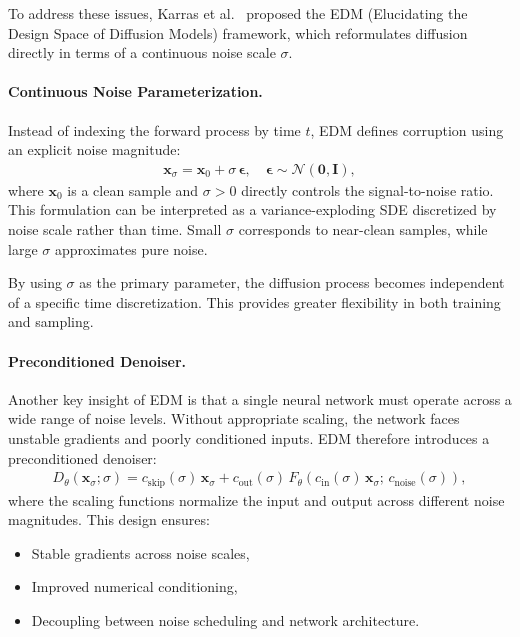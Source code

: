 To address these issues, Karras et al.~\cite{karras2022elucidating} proposed the EDM (Elucidating the Design Space of Diffusion Models) framework, which reformulates diffusion directly in terms of a continuous noise scale $\sigma$.

\paragraph{Continuous Noise Parameterization.}
Instead of indexing the forward process by time $t$, EDM defines corruption using an explicit noise magnitude:
\begin{align}
    \mathbf{x}_\sigma = \mathbf{x}_0 + \sigma\,\boldsymbol{\epsilon}, \quad \boldsymbol{\epsilon} \sim \mathcal{N}(\mathbf{0}, \mathbf{I}),
    \label{eq:edm_noise}
\end{align}
where $\mathbf{x}_0$ is a clean sample and $\sigma > 0$ directly controls the signal-to-noise ratio. This formulation can be interpreted as a variance-exploding SDE discretized by noise scale rather than time. Small $\sigma$ corresponds to near-clean samples, while large $\sigma$ approximates pure noise.

By using $\sigma$ as the primary parameter, the diffusion process becomes independent of a specific time discretization. This provides greater flexibility in both training and sampling.

\paragraph{Preconditioned Denoiser.}
Another key insight of EDM is that a single neural network must operate across a wide range of noise levels. Without appropriate scaling, the network faces unstable gradients and poorly conditioned inputs. EDM therefore introduces a preconditioned denoiser:
\begin{align}
    D_\theta(\mathbf{x}_\sigma; \sigma) = c_{\text{skip}}(\sigma)\,\mathbf{x}_\sigma + c_{\text{out}}(\sigma)\,F_\theta\!\left(c_{\text{in}}(\sigma)\,\mathbf{x}_\sigma;\, c_{\text{noise}}(\sigma)\right),
    \label{eq:edm_denoiser}
\end{align}
where the scaling functions normalize the input and output across different noise magnitudes. This design ensures:
\begin{itemize}
    \item Stable gradients across noise scales,
    \item Improved numerical conditioning,
    \item Decoupling between noise scheduling and network architecture.
\end{itemize}


